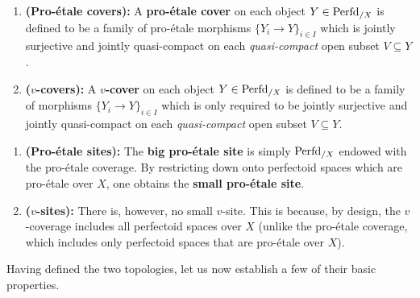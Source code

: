                 \begin{definition} \label{def: pro_etale_topology_and_v_topology}
                    \noindent
                    \begin{enumerate}
                        \item \textbf{(Pro-\'etale covers):} A \textbf{pro-\'etale cover} on each object $Y \in \mathrm{Perfd}_{/X}$ is defined to be a family of pro-\'etale morphisms $\{Y_i \to Y\}_{i \in I}$ which is jointly surjective and jointly quasi-compact on each \textit{quasi-compact} open subset $V \subseteq Y$.
                        \item \textbf{($v$-covers):} A \textbf{$v$-cover} on each object $Y \in \mathrm{Perfd}_{/X}$ is defined to be a family of morphisms $\{Y_i \to Y\}_{i \in I}$ which is only required to be jointly surjective and jointly quasi-compact on each \textit{quasi-compact} open subset $V \subseteq Y$.
                    \end{enumerate}
                \end{definition}
                \begin{remark}
                    \noindent
                    \begin{enumerate}
                        \item \textbf{(Pro-\'etale sites):} The \textbf{big pro-\'etale site} is simply $\mathrm{Perfd}_{/X}$ endowed with the pro-\'etale coverage. By restricting down onto perfectoid spaces which are pro-\'etale over $X$, one obtains the \textbf{small pro-\'etale site}. 
                        \item \textbf{($v$-sites):} There is, however, no small $v$-site. This is because, by design, the $v$-coverage includes all perfectoid spaces over $X$ (unlike the pro-\'etale coverage, which includes only perfectoid spaces that are pro-\'etale over $X$).
                    \end{enumerate}
                \end{remark}
                
                Having defined the two topologies, let us now establish a few of their basic properties.
                
